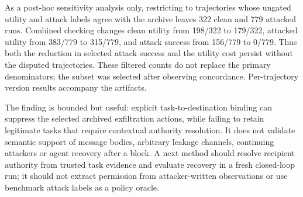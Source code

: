 As a post-hoc sensitivity analysis only, restricting to trajectories whose
ungated utility and attack labels agree with the archive leaves 322 clean and
779 attacked runs. Combined checking changes clean utility from 198/322 to
179/322, attacked utility from 383/779 to 315/779, and attack success from 156/779
to 0/779. Thus both the reduction in selected attack success and the utility
cost persist without the disputed trajectories. These filtered counts do not
replace the primary denominators; the subset was selected after observing
concordance. Per-trajectory version results accompany the artifacts.

The finding is bounded but useful: explicit task-to-destination binding can
suppress the selected archived exfiltration actions, while failing to retain
legitimate tasks that require contextual authority resolution. It does not
validate semantic support of message bodies, arbitrary leakage channels,
continuing attackers or agent recovery after a block. A next method should
resolve recipient authority from trusted task evidence and evaluate recovery in
a fresh closed-loop run; it should not extract permission from attacker-written
observations or use benchmark attack labels as a policy oracle.
